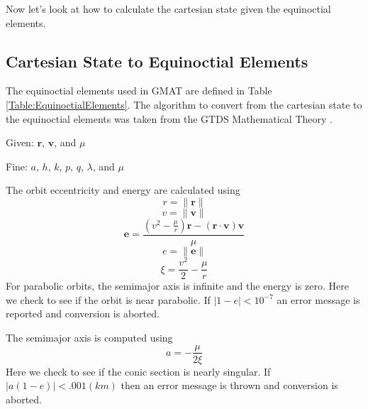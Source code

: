 Now let's look at how to calculate the cartesian state given the
equinoctial elements.

\subsection{Cartesian State to Equinoctial Elements}  
\label{Sec:CartesiantoEquinoctial}

The equinoctial elements used in GMAT are defined in Table
\ref{Table:EquinoctialElements}.  The algorithm to convert from
the cartesian state to the equinoctial elements was taken from the
GTDS Mathematical Theory \cite{GTDS}.

\noindent Given:  $\mathbf{r}$, $\mathbf{v}$, and $\mu$

\noindent Fine:  $a$, $h$, $k$, $p$, $q$, $\lambda$, and $\mu$

The orbit eccentricity and energy are calculated using
%
\begin{equation}
    r = \| \mathbf{r} \|
\end{equation}
%
\begin{equation}
    v = \| \mathbf{v} \|
\end{equation}
%
\begin{equation}
     \mathbf{e} = \displaystyle\frac{(v^2 - \displaystyle\frac{\mu}{r} )\mathbf{r} - (\mathbf{r}\cdot\mathbf{v}  )\mathbf{v}}{\mu}
\end{equation}
%
\begin{equation}
     e = \| \mathbf{e} \|
\end{equation}
%
\begin{equation}
     \xi = \frac{v^2}{2} - \frac{\mu}{r}
\end{equation}
%
For parabolic orbits, the semimajor axis is infinite
and the energy is zero. Here we check to see if the orbit is near
parabolic.  If $|1 - e| < 10^{-7}$ an error message is reported
and conversion is aborted.

The semimajor axis is computed using
%
\begin{equation}
     a = -\frac{\mu}{2\xi}
\end{equation}
%
Here we check to see if the conic section is nearly singular.
If $|a(1-e)| < .001 (km)$ then an error message is thrown and conversion is aborted.

